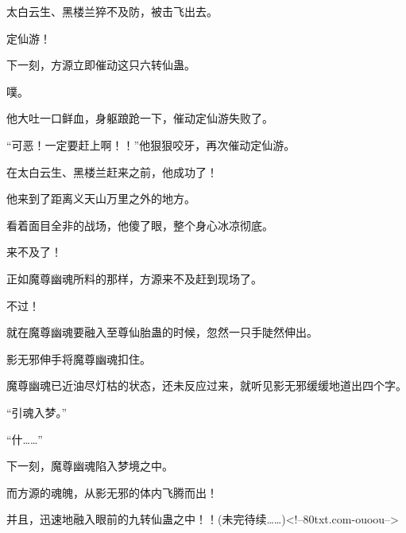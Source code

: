 \begin{this_body}
太白云生、黑楼兰猝不及防，被击飞出去。

定仙游！

下一刻，方源立即催动这只六转仙蛊。

噗。

他大吐一口鲜血，身躯踉跄一下，催动定仙游失败了。

“可恶！一定要赶上啊！！”他狠狠咬牙，再次催动定仙游。

在太白云生、黑楼兰赶来之前，他成功了！

他来到了距离义天山万里之外的地方。

看着面目全非的战场，他傻了眼，整个身心冰凉彻底。

来不及了！

正如魔尊幽魂所料的那样，方源来不及赶到现场了。

不过！

就在魔尊幽魂要融入至尊仙胎蛊的时候，忽然一只手陡然伸出。

影无邪伸手将魔尊幽魂扣住。

魔尊幽魂已近油尽灯枯的状态，还未反应过来，就听见影无邪缓缓地道出四个字。

“引魂入梦。”

“什……”

下一刻，魔尊幽魂陷入梦境之中。

而方源的魂魄，从影无邪的体内飞腾而出！

并且，迅速地融入眼前的九转仙蛊之中！！(未完待续……)<!--80txt.com-ouoou-->

\end{this_body}

